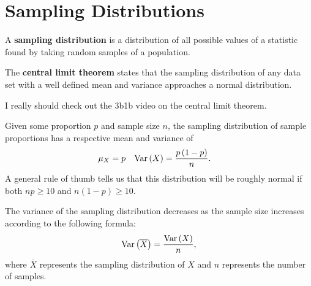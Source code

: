 \section{Sampling Distributions}

\begin{blackbox}
    \begin{definition}
        A \textbf{sampling distribution} is a distribution of all possible
        values of a statistic found by taking random samples of a population.
    \end{definition}
\end{blackbox}

\begin{blackbox}
    \begin{definition}
        The \textbf{central limit theorem} states that the sampling
        distribution of any data set with a well defined mean and variance
        approaches a normal distribution.
    \end{definition}
\end{blackbox}

I really should check out the 3b1b video on the central limit theorem.

Given some proportion \( p \) and sample size \( n \), the sampling
distribution of sample proportions has a respective mean and variance of
\begin{align*}
    \mu_X &= p & \operatorname{Var} \left( X \right) &= \frac{p \left( 1 - p \right)}{n}
.\end{align*}
A general rule of thumb tells us that this distribution will be roughly normal
if both \( np \ge 10 \) and \( n \left( 1 - p \right) \ge 10 \).

The variance of the sampling distribution decreases as the sample size increases according to the following formula:
\[
    \operatorname{Var} \left( \overline{X} \right) = \frac{\operatorname{Var} \left( X \right)}{n}
,\]
where \( \overline{X} \) represents the sampling distribution of \( X \) and \(
n \) represents the number of samples.
